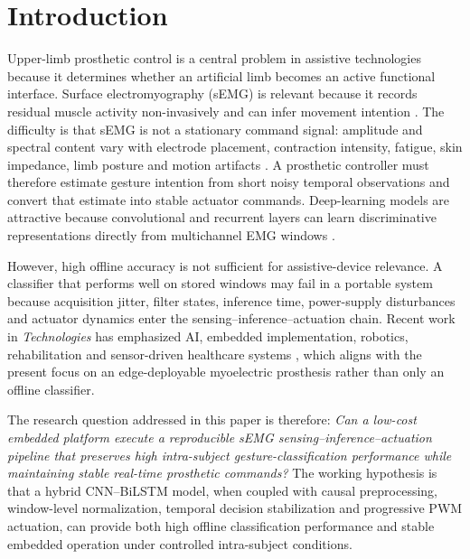\documentclass[technologies,article,submit,pdftex,moreauthors]{Definitions/mdpi}
\begin{document}
\section{Introduction}

Upper-limb prosthetic control is a central problem in assistive technologies because it determines whether an artificial limb becomes an active functional interface. Surface electromyography (sEMG) is relevant because it records residual muscle activity non-invasively and can infer movement intention \cite{Farina2014,Englehart2003,Hudgins1993,Ha2011,Kuiken2009,Cipriani2011}. The difficulty is that sEMG is not a stationary command signal: amplitude and spectral content vary with electrode placement, contraction intensity, fatigue, skin impedance, limb posture and motion artifacts \cite{Oskoei2007,Scheme2011,Chowdhury2013,Merletti1997}. A prosthetic controller must therefore estimate gesture intention from short noisy temporal observations and convert that estimate into stable actuator commands. Deep-learning models are attractive because convolutional and recurrent layers can learn discriminative representations directly from multichannel EMG windows \cite{LeCun2015,Hochreiter1997,Tsinganos2018,Celik2026,Shanmuganathan2023}.

However, high offline accuracy is not sufficient for assistive-device relevance. A classifier that performs well on stored windows may fail in a portable system because acquisition jitter, filter states, inference time, power-supply disturbances and actuator dynamics enter the sensing--inference--actuation chain. Recent work in \textit{Technologies} has emphasized AI, embedded implementation, robotics, rehabilitation and sensor-driven healthcare systems \cite{Dunai2025Tech,Covaciu2025Tech,Lotfi2018Tech,Stasolla2023Tech,Bush2024Tech,Giansanti2025Tech,Manakitsa2024Tech,Percuku2025Tech,Jalloul2025Tech,Kouretas2020Tech,Kraft2020Tech,Sanida2022Tech}, which aligns with the present focus on an edge-deployable myoelectric prosthesis rather than only an offline classifier.

The research question addressed in this paper is therefore: \textit{Can a low-cost embedded platform execute a reproducible sEMG sensing--inference--actuation pipeline that preserves high intra-subject gesture-classification performance while maintaining stable real-time prosthetic commands?} The working hypothesis is that a hybrid CNN--BiLSTM model, when coupled with causal preprocessing, window-level normalization, temporal decision stabilization and progressive PWM actuation, can provide both high offline classification performance and stable embedded operation under controlled intra-subject conditions.
\end{document}

